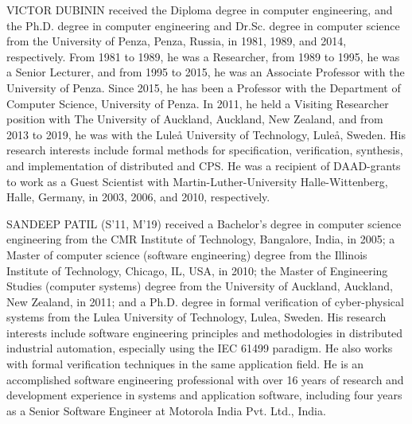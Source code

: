 \documentclass{ieeeojies}
\begin{document}
\begin{IEEEbiography}{VICTOR DUBININ} received the Diploma degree
in computer engineering, and the Ph.D. degree in
computer engineering and Dr.Sc. degree in computer science from the University of Penza, Penza,
Russia, in 1981, 1989, and 2014, respectively.
From 1981 to 1989, he was a Researcher, from
1989 to 1995, he was a Senior Lecturer, and from
1995 to 2015, he was an Associate Professor with
the University of Penza. Since 2015, he has been
a Professor with the Department of Computer Science, University of Penza. In 2011, he held a Visiting Researcher position with The University of Auckland, Auckland, New
Zealand, and from 2013 to 2019, he was with the Luleå University of Technology, Luleå, Sweden. His research interests include formal methods for
specification, verification, synthesis, and implementation of distributed and CPS. He was a recipient of DAAD-grants to work as a Guest Scientist with
Martin-Luther-University Halle-Wittenberg, Halle, Germany, in 2003, 2006,
and 2010, respectively.
\end{IEEEbiography}

\begin{IEEEbiography}{SANDEEP PATIL} (S’11, M’19) received a Bachelor’s degree in computer science engineering from the CMR Institute of Technology, Bangalore, India, in 2005; a Master of computer science (software engineering) degree from the Illinois Institute of Technology, Chicago, IL, USA, in 2010; the Master of Engineering Studies (computer systems) degree from the University of Auckland, Auckland, New Zealand, in 2011; and a Ph.D. degree in formal verification of cyber-physical systems from the Lulea University of Technology, Lulea, Sweden. His research interests include software engineering principles and methodologies in distributed industrial automation, especially using the IEC 61499 paradigm. He also works with formal verification techniques in the same application field. He is an accomplished software engineering professional with over 16 years of research and development experience in systems and application software, including four years as a Senior Software Engineer at Motorola India Pvt. Ltd., India.
\end{IEEEbiography}
\end{document}
